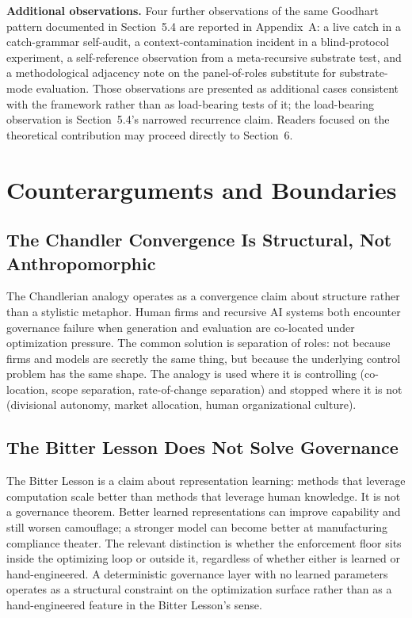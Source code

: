 \documentclass[11pt]{article}
\begin{document}
\textbf{Additional observations.} Four further observations of the same Goodhart pattern documented in Section~5.4 are reported in Appendix~A: a live catch in a catch-grammar self-audit, a context-contamination incident in a blind-protocol experiment, a self-reference observation from a meta-recursive substrate test, and a methodological adjacency note on the panel-of-roles substitute for substrate-mode evaluation. Those observations are presented as additional cases consistent with the framework rather than as load-bearing tests of it; the load-bearing observation is Section~5.4's narrowed recurrence claim. Readers focused on the theoretical contribution may proceed directly to Section~6.

\section{Counterarguments and Boundaries}

\subsection{The Chandler Convergence Is Structural, Not Anthropomorphic}

The Chandlerian analogy operates as a convergence claim about structure rather than a stylistic metaphor. Human firms and recursive AI systems both encounter governance failure when generation and evaluation are co-located under optimization pressure. The common solution is separation of roles: not because firms and models are secretly the same thing, but because the underlying control problem has the same shape. The analogy is used where it is controlling (co-location, scope separation, rate-of-change separation) and stopped where it is not (divisional autonomy, market allocation, human organizational culture).

\subsection{The Bitter Lesson Does Not Solve Governance}

The Bitter Lesson \citep{sutton2019} is a claim about representation learning: methods that leverage computation scale better than methods that leverage human knowledge. It is not a governance theorem. Better learned representations can improve capability and still worsen camouflage; a stronger model can become better at manufacturing compliance theater. The relevant distinction is whether the enforcement floor sits inside the optimizing loop or outside it, regardless of whether either is learned or hand-engineered. A deterministic governance layer with no learned parameters operates as a structural constraint on the optimization surface rather than as a hand-engineered feature in the Bitter Lesson's sense.
\end{document}
